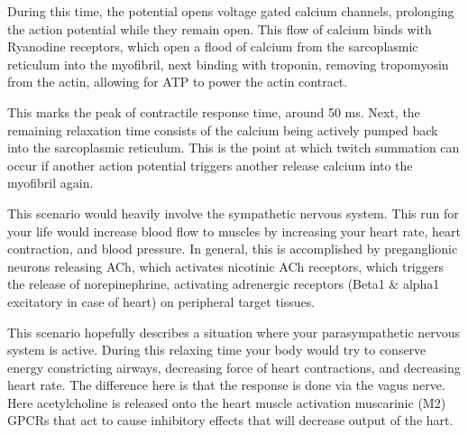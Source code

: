 \documentclass[basic]{inVerba-notes}
\begin{document}
\begin{enumerate}
  During this time, the potential opens voltage gated calcium channels, prolonging the action potential while they remain open. This flow of calcium binds with Ryanodine receptors, which open a flood of calcium from the sarcoplasmic reticulum into the myofibril, next binding with troponin, removing tropomyosin from the actin, allowing for ATP to power the actin contract.

  This marks the peak of contractile response time, around 50 ms. Next, the remaining relaxation time consists of the calcium being actively pumped back into the sarcoplasmic reticulum. This is the point at which twitch summation can occur if another action potential triggers another release calcium into the myofibril again.

  \begin{itemize}

    This scenario would heavily involve the sympathetic nervous system. This run for your life would increase blood flow to muscles by increasing your heart rate, heart contraction, and blood pressure. In general, this is accomplished by preganglionic neurons releasing ACh, which activates nicotinic ACh receptors, which triggers the release of norepinephrine, activating adrenergic receptors (Beta1 \& alpha1 excitatory in case of heart) on peripheral target tissues.




    This scenario hopefully describes a situation where your parasympathetic nervous system is active. During this relaxing time your body would try to conserve energy constricting airways, decreasing force of heart contractions, and decreasing heart rate. The difference here is that the response is done via the vagus nerve. Here acetylcholine is released onto the heart muscle activation muscarinic (M2) GPCRs that act to cause inhibitory effects that will decrease output of the hart.
  \end{itemize}



\end{enumerate}
\end{document}
